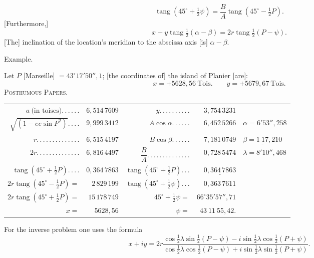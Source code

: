 \[
\operatorname{tang}(45^\circ+\tfrac12\psi)=\frac BA\operatorname{tang}(45^\circ-\tfrac12P).
\]
[Furthermore,]
\[
x+y\operatorname{tang}\tfrac12(\alpha-\beta)=2r\operatorname{tang}\tfrac12(P-\psi).
\]
[The] inclination of the location's meridian to the abscissa axis [is] $\alpha-\beta$.
\begin{center}Example.\end{center}
Let $P$ [Marseille] $=43^\circ17'50''{,}1$; [the coordinates of] the island of Planier [are]:
\[
x=+5628{,}56\ \text{Tois.}\qquad y=+5679{,}67\ \text{Tois.}
\]
\clearpage
{}\hfill\textsc{Posthumous Papers.}\hfill\mbox{}\par{}
\begin{center}
\begingroup\fontsize{8}{12}\selectfont\setlength{\tabcolsep}{3pt}\renewcommand{\arraystretch}{1.4}
\begin{tabular}{@{}r@{ }r@{\quad}r@{ }r@{\quad}l@{}}
$a\ \text{(in toises)} .\,.\,.\,.\,.\,.$&$6{,}514\,7609$&$y.\,.\,.\,.\,.\,.\,.\,.\,.\,.$&$3{,}754\,3231$&\\
$\sqrt{(1-ee\sin P^2)}.\,.\,.\,.$&$\underline{9{,}999\,3412}$&$A\cos\alpha.\,.\,.\,.\,.\,.$&$6{,}452\,5266$&$\alpha=6'53''{,}258$\\
$r.\,.\,.\,.\,.\,.\,.\,.\,.\,.\,.\,.\,.\,.$&$6{,}515\,4197$&$B\cos\beta.\,.\,.\,.\,.\,.$&$7{,}181\,0749$&$\underline{\beta=1\ 17{,}210}$\\\cline{3-4}
$2r.\,.\,.\,.\,.\,.\,.\,.\,.\,.\,.\,.\,.\,.$&$6{,}816\,4497$&$\dfrac BA.\,.\,.\,.\,.\,.\,.\,.\,.\,.\,.\,.\,.\,.$&$0{,}728\,5474$&$\lambda=8'10''{,}468$\\
$\operatorname{tang}(45^\circ+\tfrac12P).\,.\,.\,.$&$0{,}364\,7863$&$\operatorname{tang}(45^\circ+\tfrac12P).\,.\,.$&$\underline{0{,}364\,7863}$&\\
$2r\operatorname{tang}(45^\circ-\tfrac12P)=$&$2\,829\,199$&$\operatorname{tang}(45^\circ+\tfrac12\psi).\,.\,.$&$0{,}363\,7611$&\\
$2r\operatorname{tang}(45^\circ+\tfrac12P)=$&$15\,178\,749$&$45^\circ+\tfrac12\psi=$&$66^\circ35'57''{,}71$&\\
$x=$&$5628{,}56$&$\psi=$&$43\ 11\ 55{,}42.$&
\end{tabular}\par\endgroup
\end{center}
For the inverse problem one uses the formula
\[
x+iy=2r\frac{\cos\frac12\lambda\sin\frac12(P-\psi)-i\sin\frac12\lambda\cos\frac12(P+\psi)}{\cos\frac12\lambda\cos\frac12(P-\psi)+i\sin\frac12\lambda\sin\frac12(P+\psi)}.
\]
